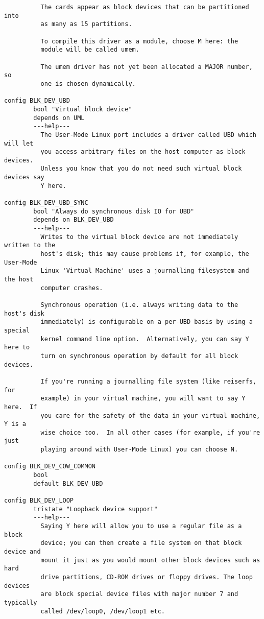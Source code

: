\documentclass[journal,10pt,onecolumn,compsoc,letterpaper,draftclsnofoot,table,xcdraw]{IEEEtran} \usepackage[margin=0.75in]{geometry}
\begin{document}
\begin{verbatim}
          The cards appear as block devices that can be partitioned into
          as many as 15 partitions.

          To compile this driver as a module, choose M here: the
          module will be called umem.

          The umem driver has not yet been allocated a MAJOR number, so
          one is chosen dynamically.

config BLK_DEV_UBD
        bool "Virtual block device"
        depends on UML
        ---help---
          The User-Mode Linux port includes a driver called UBD which will let
          you access arbitrary files on the host computer as block devices.
          Unless you know that you do not need such virtual block devices say
          Y here.

config BLK_DEV_UBD_SYNC
        bool "Always do synchronous disk IO for UBD"
        depends on BLK_DEV_UBD
        ---help---
          Writes to the virtual block device are not immediately written to the
          host's disk; this may cause problems if, for example, the User-Mode
          Linux 'Virtual Machine' uses a journalling filesystem and the host
          computer crashes.

          Synchronous operation (i.e. always writing data to the host's disk
          immediately) is configurable on a per-UBD basis by using a special
          kernel command line option.  Alternatively, you can say Y here to
          turn on synchronous operation by default for all block devices.

          If you're running a journalling file system (like reiserfs, for
          example) in your virtual machine, you will want to say Y here.  If
          you care for the safety of the data in your virtual machine, Y is a
          wise choice too.  In all other cases (for example, if you're just
          playing around with User-Mode Linux) you can choose N.

config BLK_DEV_COW_COMMON
        bool
        default BLK_DEV_UBD

config BLK_DEV_LOOP
        tristate "Loopback device support"
        ---help---
          Saying Y here will allow you to use a regular file as a block
          device; you can then create a file system on that block device and
          mount it just as you would mount other block devices such as hard
          drive partitions, CD-ROM drives or floppy drives. The loop devices
          are block special device files with major number 7 and typically
          called /dev/loop0, /dev/loop1 etc.


\end{verbatim}
\end{document}
